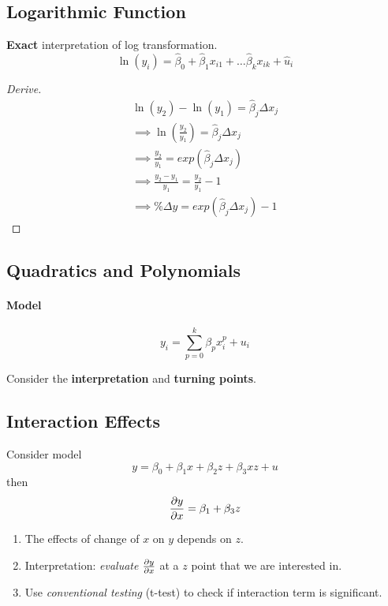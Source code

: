 \documentclass[]{article}
\begin{document}
    	\subsection{Logarithmic Function}
    		\par \textbf{Exact} interpretation of log transformation.
    			\[
    				\ln(y_i) = \hat{\beta}_0 + \hat{\beta}_1 x_{i1} + \dots \hat{\beta}_k x_{ik} + \hat{u}_i
    			\]
    			\begin{proof}[Derive]
	    			\begin{gather*}
	    				\ln(y_2) - \ln(y_1) = \hat{\beta}_j \Delta x_j \\
	    				\implies \ln(\frac{y_2}{y_1}) = \hat{\beta}_j \Delta x_j \\
	    				\implies \frac{y_2}{y_1} = exp(\hat{\beta}_j \Delta x_j) \\
	    				\implies \frac{y_2 - y_1}{y_1} 
	    				= \frac{y_2}{y_1} - 1 \\
	    				\implies \%\Delta y= exp(\hat{\beta}_j \Delta x_j) - 1
	    			\end{gather*}
    			\end{proof}
    	\subsection{Quadratics and Polynomials}
    		\paragraph{Model}
    			\[
    				y_i = \sum_{p=0}^k {\beta_p x_{i}^p} + u_i
    			\]
    		\begin{remark}
    			Consider the \textbf{interpretation} and \textbf{turning points}.
    		\end{remark}
    	\subsection{Interaction Effects}
    		\par Consider model
    		\[
    			y = \beta_0 + \beta_1 x + \beta_2 z + \beta_3 xz + u
    		\]
    		then 
    		\[
    			\frac{\partial{y}}{\partial{x}} = \beta_1 + \beta_3 z
    		\]
    		\begin{enumerate}
    			\item The effects of change of $x$ on $y$ depends on $z$.
    			\item Interpretation: \emph{evaluate} $\frac{\partial{y}}{\partial{x}}$ at a $z$ point that we are interested in.
    			\item Use \emph{conventional testing} (t-test) to check if interaction term is significant.
    		\end{enumerate}
\end{document}

